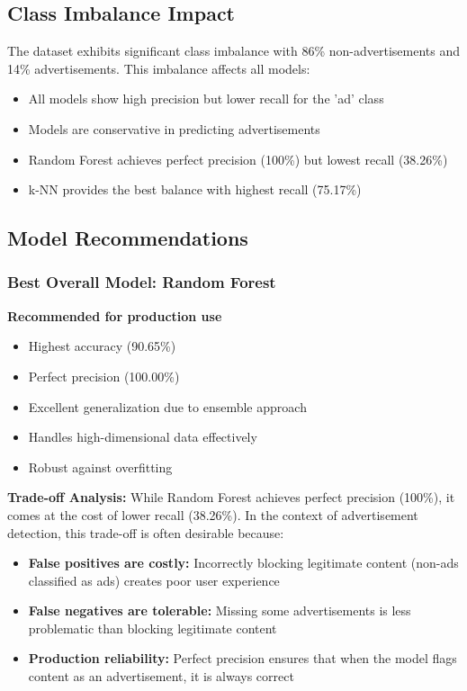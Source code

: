 \subsection{Class Imbalance Impact}

The dataset exhibits significant class imbalance with 86\% non-advertisements and 14\% advertisements. This imbalance affects all models:

\begin{itemize}
    \item All models show high precision but lower recall for the 'ad' class
    \item Models are conservative in predicting advertisements
    \item Random Forest achieves perfect precision (100\%) but lowest recall (38.26\%)
    \item k-NN provides the best balance with highest recall (75.17\%)
\end{itemize}

\subsection{Model Recommendations}

\subsubsection{Best Overall Model: Random Forest}
\textbf{Recommended for production use}
\begin{itemize}
    \item Highest accuracy (90.65\%)
    \item Perfect precision (100.00\%)
    \item Excellent generalization due to ensemble approach
    \item Handles high-dimensional data effectively
    \item Robust against overfitting
\end{itemize}

\textbf{Trade-off Analysis:} While Random Forest achieves perfect precision (100\%), it comes at the cost of lower recall (38.26\%). In the context of advertisement detection, this trade-off is often desirable because:
\begin{itemize}
    \item \textbf{False positives are costly:} Incorrectly blocking legitimate content (non-ads classified as ads) creates poor user experience
    \item \textbf{False negatives are tolerable:} Missing some advertisements is less problematic than blocking legitimate content
    \item \textbf{Production reliability:} Perfect precision ensures that when the model flags content as an advertisement, it is always correct
\end{itemize}

